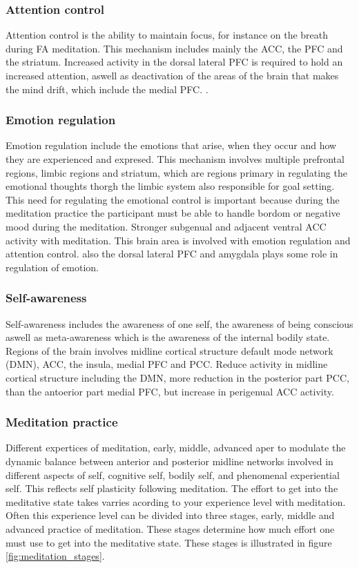 \subsubsection{Attention control}
Attention control is the ability to maintain focus, for instance on the breath during FA meditation. This mechanism includes mainly the ACC, the PFC and the striatum. 
Increased activity in the dorsal lateral PFC is required to hold an increased attention, aswell as deactivation of the areas of the brain that makes the mind drift, which include the medial PFC. \cite{Tang2017}.

\subsubsection{Emotion regulation}
Emotion regulation include the emotions that arise, when they occur and how they are experienced and expresed. This mechanism involves multiple prefrontal regions, limbic regions and striatum, which are regions primary in regulating the emotional thoughts thorgh the limbic system also responsible for goal setting. This need for regulating the emotional control is important because during the meditation practice the participant must be able to handle bordom or negative mood during the meditation. Stronger subgenual and adjacent ventral ACC activity with meditation. This brain area is involved with emotion regulation and attention control. also the dorsal lateral PFC and amygdala plays some role in regulation of emotion. 

\subsubsection{Self-awareness}
Self-awareness includes the awareness of one self, the awareness of being conscious aswell as meta-awareness which is the awareness of the internal bodily state. Regions of the brain involves midline cortical structure default mode network (DMN), ACC, the insula, medial PFC and PCC. Reduce activity in midline cortical structure including the DMN, more reduction in the posterior part PCC, than the antoerior part medial PFC, but increase in perigenual ACC activity.

\subsubsection{Meditation practice}
Different expertices of meditation, early, middle, advanced aper to modulate the dynamic balance between anterior and posterior midline networks involved in different aspects of self, cognitive self, bodily self, and phenomenal experiential self. This reflects self plasticity following meditation. 
The effort to get into the meditative state takes varries acording to your experience level with meditation. Often this experience level can be divided into three stages, early, middle and advanced practice of meditation. These stages determine how much effort one must use to get into the meditative state. These stages is illustrated in figure \ref{fig:meditation_stages}.

